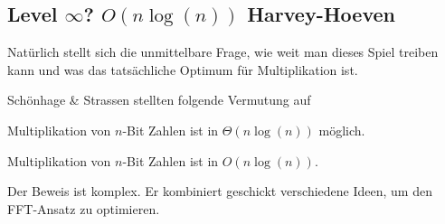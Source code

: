 
\subsection{Level \texorpdfstring{$\infty$}{infinity}? \texorpdfstring{$O(n\log(n))$}{O(n log(n))} Harvey-Hoeven}

\begin{remark}
    Natürlich stellt sich die unmittelbare Frage, wie weit man dieses Spiel treiben kann und was das tatsächliche Optimum für Multiplikation ist.

    Schönhage \& Strassen stellten folgende Vermutung auf
\end{remark}

\begin{conjecture}
    Multiplikation von $n$-Bit Zahlen ist in $\Theta(n\log(n))$ möglich.
\end{conjecture}

\begin{theorem}
    Multiplikation von $n$-Bit Zahlen ist in $O(n\log(n))$.
\end{theorem}

\begin{remark}
    Der Beweis ist komplex. Er kombiniert geschickt verschiedene Ideen, um den FFT-Ansatz zu optimieren.
\end{remark}


